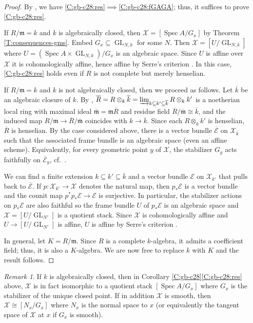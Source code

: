 \documentclass[a4paper]{amsart}
\theoremstyle{plain}
\theoremstyle{definition}
\theoremstyle{remark}
\newtheorem{remark}[theorem]{Remark}
\numberwithin{equation}{section}
\newcommand{\fm}{\mathfrak{m}}
\newcommand\cX{\mathcal{X}}
\DeclareMathOperator{\Spec}{Spec}
\DeclareMathOperator{\GL}{GL}
\newcommand{\tensor}{\otimes}
\newcommand{\itemref}[1]{\eqref{#1}}
\newcommand{\shv}[1]{\mathcal{{#1}}}
\begin{document}
\begin{proof}%
    By \cite[Thm.~1]{geraschenko-brown}, we have \itemref{C:gb-c28:res}$\implies$\itemref{C:gb-c28:fGAGA}; thus, it suffices to prove \itemref{C:gb-c28:res}. 

  If $R/\fm 
  =k$ and $k$ is algebraically closed, then $\cX=[\Spec A/G_x]$ by Theorem 
  \ref{T:consequences-gms}. Embed $G_x \subseteq \GL_{N,k}$ for some $N$.
  Then $\cX=[U/\GL_{N,k}]$ where $U=(\Spec A \times \GL_{N,k})/G_x$ is an
  algebraic space. Since $U$ is affine over $\cX$ it is cohomologically affine,
  hence affine by Serre's criterion \cite[Prop.~3.3]{alper-good}.
  In this case, \itemref{C:gb-c28:res} holds even if $R$ is not
  complete but merely henselian.

  If $R/\fm=k$ and $k$ is not algebraically closed, then we proceed as follows. Let 
  $\overline{k}$ be an algebraic closure of $k$. By \cite[$0_{\mathrm{III}}$.10.3.1.3]{EGA}, 
  $\overline{R}=R\otimes_k \overline{k}=\varinjlim_{k \subseteq k' \subseteq \overline{k}} R\tensor_k k'$ is a noetherian local ring with maximal ideal $\overline{\fm} = 
  \fm\overline{R}$ and residue field $\overline{R}/\overline{\fm}\cong \overline{k}$, and the induced 
  map $R/\fm \to \overline{R}/\overline{\fm}$ coincides with $k \to \overline{k}$. Since each $R\otimes_k k'$ is henselian, $\overline{R}$ is henselian.
  By the case considered above, there is a vector bundle $\overline{\shv{E}}$ on
  $\cX_{\overline{k}}$ such that the associated frame bundle is an algebraic space (even
  an affine scheme). Equivalently, for every geometric point $y$ of $\cX$,
  the stabilizer $G_y$ acts faithfully on $\overline{\shv{E}}_y$, cf.\
  \cite[Lem.~2.12]{ehkv}.

  We can find a finite extension
  $k \subseteq k' \subseteq \overline{k}$ and a vector bundle $\shv{E}$ on
  $\cX_{k'}$ that pulls back to $\overline{\shv{E}}$. If $p\colon \cX_{k'}\to \cX$
  denotes the natural map, then $p_*\shv{E}$ is a vector bundle and the counit map
  $p^*p_*\shv{E}\to \shv{E}$ is surjective. In particular, the stabilizer
  actions on $p_*\shv{E}$ are also faithful so the frame bundle $U$ of
  $p_*\shv{E}$ is an algebraic space
  and $\cX=[U/\GL_{N'}]$ is a quotient stack. 
  Since $\cX$ is cohomologically affine
  and $U \to [U/\GL_{N'}]$ is affine, $U$ is affine by Serre's criterion
  \cite[Prop.~3.3]{alper-good}.
  
  In general, let $K=R/\fm$. Since $R$ is a complete $k$-algebra, it admits a coefficient 
  field; thus, it is also a $K$-algebra. We are now free to replace $k$ with 
  $K$ and the result follows.
\end{proof}
%
\begin{remark}  If $k$ is algebraically closed, then in Corollary \ref{C:gb-c28}\itemref{C:gb-c28:res} above, $\cX$ is in fact isomorphic to a quotient stack $[\Spec A / G_x]$ where $G_x$ is the stabilizer of the unique closed point.  If in addition $\cX$ is smooth, then $\cX \cong [N_x/G_x]$ where $N_x$ is the normal space to $x$ (or equivalently the tangent space of $\cX$ at $x$ if $G_x$ is smooth).
\end{remark}
\end{document}
